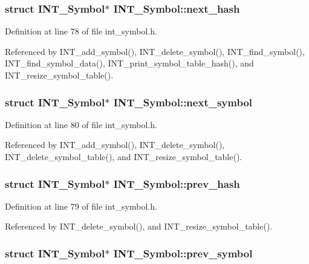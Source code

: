 \subsubsection{\setlength{\rightskip}{0pt plus 5cm}struct \bf{INT\_\-Symbol}$\ast$ \bf{INT\_\-Symbol::next\_\-hash}}\label{structINT__Symbol_2db5eb831824451b7e7b2ef106f86365}




Definition at line 78 of file int\_\-symbol.h.

Referenced by INT\_\-add\_\-symbol(), INT\_\-delete\_\-symbol(), INT\_\-find\_\-symbol(), INT\_\-find\_\-symbol\_\-data(), INT\_\-print\_\-symbol\_\-table\_\-hash(), and INT\_\-resize\_\-symbol\_\-table().
\subsubsection{\setlength{\rightskip}{0pt plus 5cm}struct \bf{INT\_\-Symbol}$\ast$ \bf{INT\_\-Symbol::next\_\-symbol}}\label{structINT__Symbol_2e66816ffa140184184a1645c9e60226}




Definition at line 80 of file int\_\-symbol.h.

Referenced by INT\_\-add\_\-symbol(), INT\_\-delete\_\-symbol(), INT\_\-delete\_\-symbol\_\-table(), and INT\_\-resize\_\-symbol\_\-table().
\subsubsection{\setlength{\rightskip}{0pt plus 5cm}struct \bf{INT\_\-Symbol}$\ast$ \bf{INT\_\-Symbol::prev\_\-hash}}\label{structINT__Symbol_2b2782610964ff3ced475ce23a80cc7c}




Definition at line 79 of file int\_\-symbol.h.

Referenced by INT\_\-delete\_\-symbol(), and INT\_\-resize\_\-symbol\_\-table().
\subsubsection{\setlength{\rightskip}{0pt plus 5cm}struct \bf{INT\_\-Symbol}$\ast$ \bf{INT\_\-Symbol::prev\_\-symbol}}\label{structINT__Symbol_e65e4f54c047ed241b501175bb818278}




